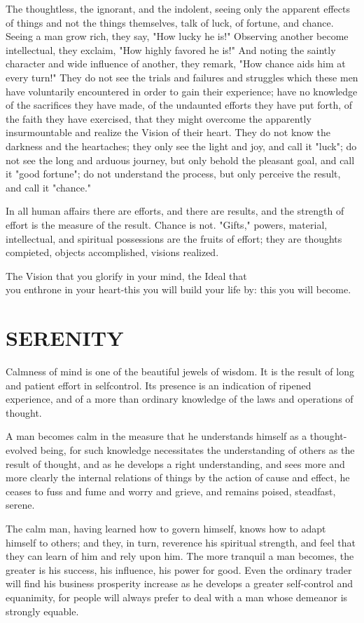 \documentclass[10pt]{article}
\begin{document}
The thoughtless, the ignorant, and the indolent, seeing only the apparent effects of things and not the things themselves, talk of luck, of fortune, and chance. Seeing a man grow rich, they say, "How lucky he is!" Observing another become intellectual, they exclaim, "How highly favored he is!" And noting the saintly character and wide influence of another, they remark, "How chance aids him at every turn!" They do not see the trials and failures and struggles which these men have voluntarily encountered in order to gain their experience; have no knowledge of the sacrifices they have made, of the undaunted efforts they have put forth, of the faith they have exercised, that they might overcome the apparently insurmountable and realize the Vision of their heart. They do not know the darkness and the heartaches; they only see the light and joy, and call it "luck"; do not see the long and arduous journey, but only behold the pleasant goal, and call it "good fortune"; do not understand the process, but only perceive the result, and call it "chance."

In all human affairs there are efforts, and there are results, and the strength of effort is the measure of the result. Chance is not. "Gifts," powers, material, intellectual, and spiritual possessions are the fruits of effort; they are thoughts compieted, objects accomplished, visions realized.

The Vision that you glorify in your mind, the Ideal that\\
you enthrone in your heart-this you will build your life by: this you will become.

\section*{SERENITY}
Calmness of mind is one of the beautiful jewels of wisdom. It is the result of long and patient effort in selfcontrol. Its presence is an indication of ripened experience, and of a more than ordinary knowledge of the laws and operations of thought.

A man becomes calm in the measure that he understands himself as a thought-evolved being, for such knowledge necessitates the understanding of others as the result of thought, and as he develops a right understanding, and sees more and more clearly the internal relations of things by the action of cause and effect, he ceases to fuss and fume and worry and grieve, and remains poised, steadfast, serene.

The calm man, having learned how to govern himself, knows how to adapt himself to others; and they, in turn, reverence his spiritual strength, and feel that they can learn of him and rely upon him. The more tranquil a man becomes, the greater is his success, his influence, his power for good. Even the ordinary trader will find his business prosperity increase as he develops a greater self-control and equanimity, for people will always prefer to deal with a man whose demeanor is strongly equable.
\end{document}
